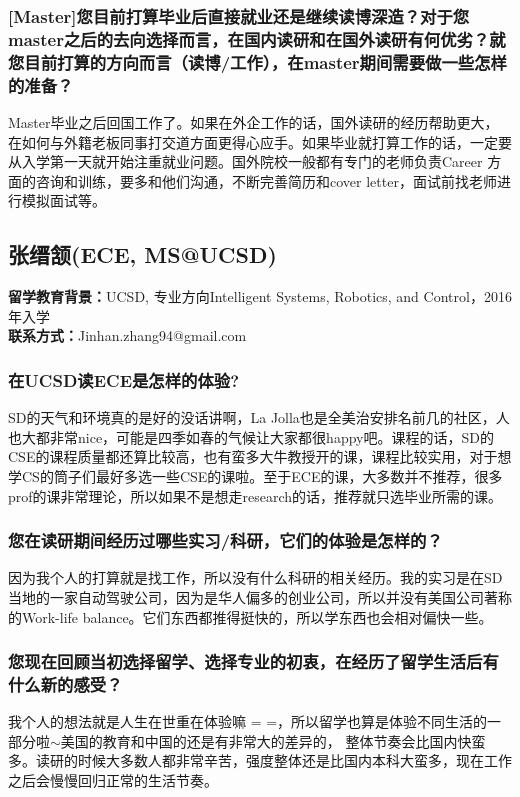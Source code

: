 \documentclass[a4paper,UTF8]{book}
\begin{document}
    \subsubsection*{[Master]您目前打算毕业后直接就业还是继续读博深造？对于您master之后的去向选择而言，在国内读研和在国外读研有何优劣？就您目前打算的方向而言（读博/工作），在master期间需要做一些怎样的准备？}
    Master毕业之后回国工作了。如果在外企工作的话，国外读研的经历帮助更大，在如何与外籍老板同事打交道方面更得心应手。如果毕业就打算工作的话，一定要从入学第一天就开始注重就业问题。国外院校一般都有专门的老师负责Career 方面的咨询和训练，要多和他们沟通，不断完善简历和cover letter，面试前找老师进行模拟面试等。


\clearpage
\subsection{张缙颔(ECE, MS@UCSD)}
    \textbf{留学教育背景：}UCSD, 专业方向Intelligent Systems, Robotics, and Control，2016年入学\\
    \textbf{联系方式：}Jinhan.zhang94@gmail.com

    \subsubsection*{在UCSD读ECE是怎样的体验?}
    SD的天气和环境真的是好的没话讲啊，La Jolla也是全美治安排名前几的社区，人也大都非常nice，可能是四季如春的气候让大家都很happy吧。课程的话，SD的CSE的课程质量都还算比较高，也有蛮多大牛教授开的课，课程比较实用，对于想学CS的筒子们最好多选一些CSE的课啦。至于ECE的课，大多数并不推荐，很多prof的课非常理论，所以如果不是想走research的话，推荐就只选毕业所需的课。
    
    \subsubsection*{您在读研期间经历过哪些实习/科研，它们的体验是怎样的？}
    因为我个人的打算就是找工作，所以没有什么科研的相关经历。我的实习是在SD当地的一家自动驾驶公司，因为是华人偏多的创业公司，所以并没有美国公司著称的Work-life balance。它们东西都推得挺快的，所以学东西也会相对偏快一些。
    
    \subsubsection*{您现在回顾当初选择留学、选择专业的初衷，在经历了留学生活后有什么新的感受？}
    我个人的想法就是人生在世重在体验嘛 = =，所以留学也算是体验不同生活的一部分啦$\sim$美国的教育和中国的还是有非常大的差异的， 整体节奏会比国内快蛮多。读研的时候大多数人都非常辛苦，强度整体还是比国内本科大蛮多，现在工作之后会慢慢回归正常的生活节奏。
\end{document}
